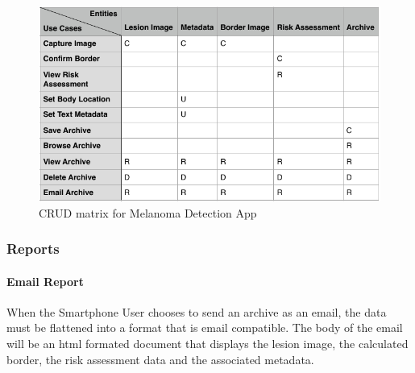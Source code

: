                 \begin{figure}[H]
                    \centering
                    \includegraphics[width=\textwidth]{assets/requirements/CRUD.pdf}
                    \caption{CRUD matrix for Melanoma Detection App}
                    \label{fig:crud}
                \end{figure}

        \subsubsection{Reports}
            \paragraph{Email Report}
                When the Smartphone User chooses to send an archive as an email, the data must be flattened into a format that is email compatible. The body of the email will be an html formated document that displays the lesion image, the calculated border, the risk assessment data and the associated metadata.



